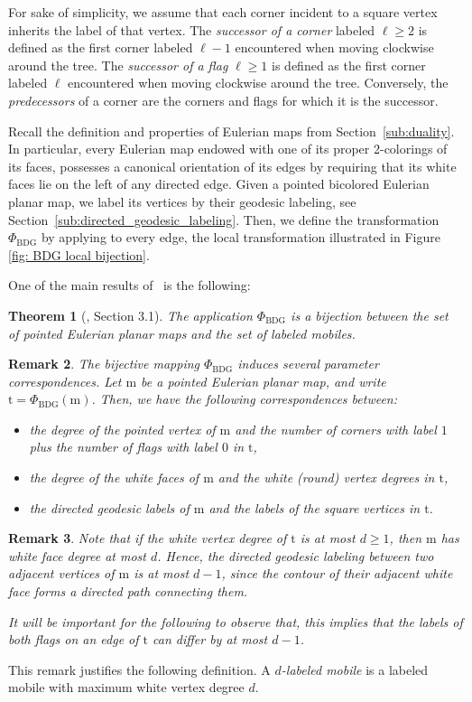 \documentclass[11pt,reqno,tbtags]{amsart}
\renewcommand{\rm}{\mathrm{m}}
\newcommand{\rt}{\mathrm{t}}
\newtheorem{theo}{Theorem}
\newtheorem{rema}[theo]{Remark}
\numberwithin{equation}{section}
\numberwithin{theo}{section}
\theoremstyle{definition}
\begin{document}
For sake of simplicity, we assume that each corner incident to a square vertex inherits the label of that vertex.  The \emph{successor of a corner} labeled $\ell\geq 2$ is defined as the first corner labeled  $\ell - 1$ encountered when  moving clockwise around the tree. The \emph{successor of a flag} $\ell\geq 1$ is defined as the first corner labeled  $\ell$ encountered when  moving clockwise around the tree. 
Conversely, the \emph{predecessors} of a corner are the corners and flags for which it is the successor.

Recall the definition and properties of Eulerian maps from Section~\ref{sub:duality}. In particular, every Eulerian map endowed with one of its proper 2-colorings of its faces, possesses a canonical orientation of its edges by requiring that its white faces lie on the left of any directed edge. 
Given a pointed bicolored Eulerian planar map, we label its vertices by their geodesic labeling, see Section~\ref{sub:directed_geodesic_labeling}. 
Then, we define the transformation $\Phi_{\mathrm{BDG}}$ by applying to every edge, the local transformation illustrated in Figure \ref{fig: BDG local bijection}. 

One of the main results of~\cite{BouttierDiFrancescoGuitter_Mobiles} is the following: 
\begin{theo}[\cite{BouttierDiFrancescoGuitter_Mobiles}, Section 3.1]\label{theo: BDG bijection}
The application $\Phi_\mathrm{BDG}$ is a bijection between the set of pointed Eulerian planar maps and the set of labeled mobiles.
\end{theo}

\begin{rema}
The bijective mapping $\Phi_\mathrm{BDG}$ induces several parameter correspondences. Let $\rm$ be a pointed Eulerian planar map, and write $\rt=\Phi_\mathrm{BDG}(\rm)$. Then, we have the following correspondences between:
\begin{itemize}
	\item the degree of the pointed vertex of $\rm$ and the number of corners with label $1$ plus the number of flags with label $0$ in $\rt$,
	\item the degree of the white faces of $\rm$ and the white (round) vertex degrees in $\rt$,
	\item the directed geodesic labels of $\rm$ and the labels of the square vertices in $\rt$.
\end{itemize}
\end{rema}


\begin{rema}\label{rema: BDG bijection}
Note that if the white vertex degree of $\rt$ is at most $d\geq 1$, then $\rm$ has white face degree at most $d$. Hence, the directed geodesic labeling between two adjacent vertices of $\rm$ is at most $d-1$, since the contour of their adjacent white face forms a directed path connecting them.

It will be important for the following to observe that, this implies that the labels of both flags on an edge of $\rt$ can differ by at most $d-1$.
\end{rema}
This remark justifies the following definition. A \emph{$d$-labeled mobile} is a labeled mobile with maximum white vertex degree $d$. 
\end{document}
